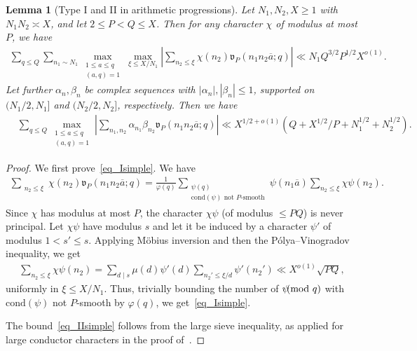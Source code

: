 \documentclass[12pt]{amsart}
\newtheorem{lemma}[theorem]{Lemma}
\theoremstyle{definition}
\theoremstyle{remark}
\numberwithin{equation}{section}
\newcommand{\1}{\mathbf{1}}
\let\oldpmod\pmod
\renewcommand{\pmod}[1]{\hspace{-0.12cm}\oldpmod {#1}}
\begin{document}
\begin{lemma}[Type I and II in arithmetic progressions]\label{le_I,IIsimple}
	 Let $N_1, N_2, X\geq 1$ with $N_1N_2\asymp X$, and let $2\leq P< Q\leq X$. Then for any character $\chi$ of modulus at most $P$, we have 
	\begin{align}\label{eq_Isimple}
	\sum_{q\leq Q}\sum_{n_1 \sim N_1}  \max_{\substack{1\leq a\leq q\\ (a,q)=1}}\max_{\xi\leq X/N_1}\left|\sum_{ n_2 \leq \xi}\chi(n_2)\mathfrak{v}_{P}(n_1n_2\overline{a};q) \right|\ll N_1 Q^{3/2}P^{1/2}X^{o(1)}. 
	\end{align}
	Let further $\alpha_n,\beta_n$ be complex sequences with $|\alpha_n|, |\beta_n|\leq 1$, supported on $(N_1/2,N_1]$ and $(N_2/2,N_2]$, respectively. Then we have
	\begin{align}\label{eq_IIsimple} 
	&\sum_{q\leq Q}\max_{\substack{1\leq a\leq q\\ (a,q)=1}}\left|\sum_{n_1,n_2}\alpha_{n_1}\beta_{n_2} \mathfrak{v}_{P}(n_1n_2\overline{a};q)\right|
	\ll X^{1/2+o(1)}(Q+X^{1/2}/P+N_1^{1/2}+N_2^{1/2}).
	\end{align}
\end{lemma}


\begin{proof}We first prove~\eqref{eq_Isimple}. We have
	\begin{align*}
	\sum_{\substack{n_2\leq \xi}}\chi(n_2)\mathfrak{v}_{P}(n_1n_2\overline{a};q)=\frac{1}{\varphi(q)}\sum_{\substack{\psi(q)\\ \text{cond}(\psi)\text{ not }P\text{-smooth}}} \psi(n_1\overline{a}) \sum_{n_2\leq \xi}\chi\psi(n_2).
	\end{align*}
	Since $\chi$ has modulus at most $P$, the character $\chi \psi $ (of modulus $\leq PQ$) is never principal. Let $\chi\psi$ have modulus $s$ and let it be induced by a character $\psi'$ of modulus $1<s'\leq s$. Applying M\"obius inversion and then the P\'olya--Vinogradov inequality, we get
 \begin{align*}
     \sum_{n_2 \le \xi}\chi\psi(n_2)=\sum_{d\mid s}\mu(d)\psi'(d)\sum_{n_2'\leq \xi/ d}\psi'(n_2')\ll X^{o(1)} \sqrt{PQ},
 \end{align*}
 uniformly in $\xi\leq X/N_1$.
 Thus, trivially bounding the number of $\psi \pmod{q}$ with $\text{cond}(\psi)$ not $P$-smooth by $\varphi(q)$, we get~\eqref{eq_Isimple}.
	
	The bound~\eqref{eq_IIsimple} follows from the large sieve inequality, as applied for large conductor characters in the proof of~\cite[Proposition 17.4]{iw-kow}.
\end{proof}
\end{document}
